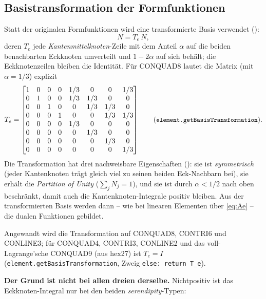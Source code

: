 \documentclass[a4paper,11pt]{article}
\def\bm#1{#1}%
\def\tfrac#1#2{#1/#2}%
\def\tilde#1{#1}%
\newcommand{\code}[1]{\texttt{\small #1}}
\begin{document}
\subsection{Basistransformation der Formfunktionen}
Statt der originalen Formfunktionen wird eine transformierte Basis verwendet
(\citealp[Gl.~(4.5)]{popp2012}):
\begin{equation}
\tilde{\bm N} = \bm T_e\,\bm N,
\end{equation}
deren $\bm T_e$ jede \emph{Kantenmittelknoten}-Zeile mit dem Anteil $\alpha$ auf die beiden
benachbarten Eckknoten umverteilt und $1-2\alpha$ auf sich behält; die Eckknotenzeilen bleiben die
Identität. Für CONQUAD8 lautet die Matrix (mit $\alpha=\tfrac13$) explizit
\begin{equation}
\bm T_e=\begin{bmatrix}
1&0&0&0&\tfrac13&0&0&\tfrac13\\
0&1&0&0&\tfrac13&\tfrac13&0&0\\
0&0&1&0&0&\tfrac13&\tfrac13&0\\
0&0&0&1&0&0&\tfrac13&\tfrac13\\
0&0&0&0&\tfrac13&0&0&0\\
0&0&0&0&0&\tfrac13&0&0\\
0&0&0&0&0&0&\tfrac13&0\\
0&0&0&0&0&0&0&\tfrac13
\end{bmatrix}
\qquad (\code{element.getBasisTransformation}).
\end{equation}
Die Transformation hat drei nachweisbare Eigenschaften (\citealp[S.~B431]{popp2012}): sie ist
\emph{symmetrisch} (jeder Kantenknoten trägt gleich viel zu seinen beiden Eck-Nachbarn bei), sie
erhält die \emph{Partition of Unity} ($\sum_j \tilde N_j = 1$), und sie ist durch
$\alpha < \tfrac12$ nach oben beschränkt, damit auch die Kantenknoten-Integrale positiv bleiben. Aus
der transformierten Basis werden dann -- wie bei linearen Elementen über \eqref{eq:Ae} -- die dualen
Funktionen gebildet.

Angewandt wird die Transformation auf CONQUAD8, CONTRI6 und CONLINE3; für CONQUAD4, CONTRI3,
CONLINE2 und das voll-Lagrange'sche CONQUAD9 (aus hex27) ist $\bm T_e=\bm I$
(\code{element.getBasisTransformation}, Zweig \code{else: return T\_e}).

\medskip
\noindent\textbf{Der Grund ist nicht bei allen dreien derselbe.} Nichtpositiv ist das
Eckknoten-Integral nur bei den beiden \emph{serendipity}-Typen:
\end{document}
